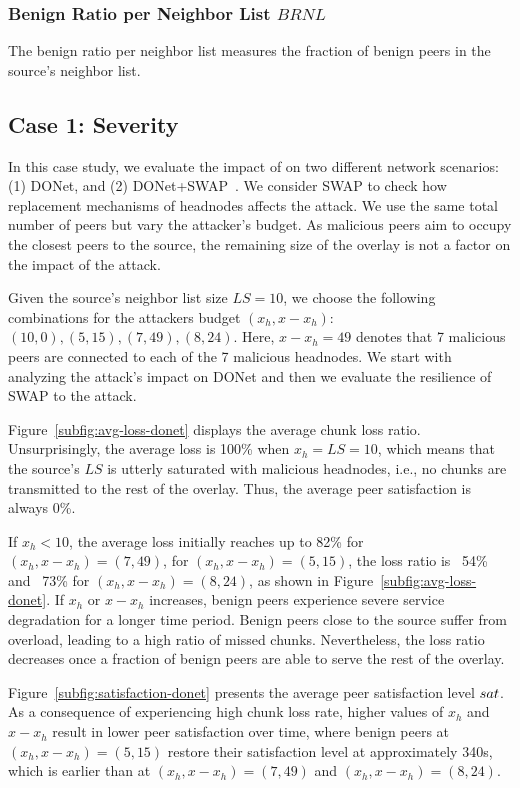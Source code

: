 \subsubsection*{Benign Ratio per Neighbor List $BRNL$} The benign ratio per neighbor list measures the fraction of benign peers in the source's neighbor list.

\subsection{Case 1: \drop Severity}

In this case study, we evaluate the impact of \drop on two different network scenarios:  (1) DONet, and (2) DONet+SWAP~\cite{nguyen2016swap}. We consider SWAP to check how replacement mechanisms of headnodes affects the attack. 
We use the same total number of peers but vary the attacker's budget.
As malicious peers aim to occupy the closest peers to the source, the remaining size of the overlay is not a factor on the impact of the \drop attack.

Given the source's neighbor list size $LS=10$, we choose the following combinations for the attackers budget $(x_h, x-x_h)$: $(10,0), (5,15), (7,49), (8,24)$.
Here, $x-x_h=49$ denotes that 7 malicious peers are connected to each of the 7 malicious headnodes.
We start with analyzing the attack's impact on DONet and then we evaluate the resilience of SWAP to the attack.

Figure~\ref{subfig:avg-loss-donet} displays the average chunk loss ratio.
Unsurprisingly, the average loss is 100\% when $x_h= LS =10$, which means that the source's $LS$ is utterly saturated with malicious headnodes, i.e., no chunks are transmitted to the rest of the overlay.
Thus, the average peer satisfaction is always 0\%. 

If $x_h < 10$, the average loss initially reaches up to 82\% for $(x_h, x-x_h)=(7, 49)$, for $(x_h, x-x_h)=(5, 15)$, the loss ratio is ~54\% and ~73\% for $(x_h, x-x_h)=(8, 24)$, as shown in Figure~\ref{subfig:avg-loss-donet}.
If $x_h$ or $x-x_h$ increases, benign peers experience severe service degradation for a longer time period. 
Benign peers close to the source suffer from overload, leading to a high ratio of missed chunks. 
Nevertheless, the loss ratio decreases once a fraction of benign peers are able to serve the rest of the overlay.

Figure~\ref{subfig:satisfaction-donet} presents the average peer satisfaction level $sat$.
As a consequence of experiencing high chunk loss rate, higher values of $x_h$ and $x-x_h$ result in lower peer satisfaction over time, where benign peers at $(x_h, x-x_h)=(5, 15)$ restore their satisfaction level at approximately 340s, which is earlier than at $(x_h, x-x_h)=(7, 49)$ and $(x_h, x-x_h)=(8, 24)$.

